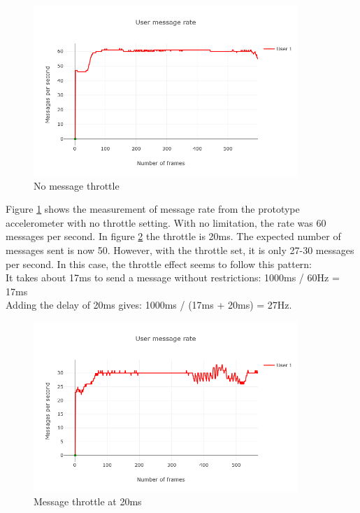 \documentclass{l4proj}
\begin{document}
\begin{figure}[h!]
    \centering
    \includegraphics[width=10cm]{./images/nomthrot.png}
    \caption{No message throttle}
    \label{fig:nomthrot}
\end{figure}

Figure \ref{fig:nomthrot} shows the measurement of message rate from the prototype accelerometer with no throttle setting. With no limitation, the rate was 60 messages per second. In figure \ref{mthrot} the throttle is 20ms. The expected number of messages sent is now 50. However, with the throttle set, it is only 27-30 messages per second. In this case, the throttle effect seems to follow this pattern: \\ 
It takes about 17ms to send a message without restrictions: 1000ms / 60Hz = 17ms \\ 
Adding the delay of 20ms gives: 1000ms / (17ms + 20ms) = 27Hz. \par

\pagebreak

\begin{figure}[h!]
    \centering
        \includegraphics[width=10cm]{./images/mthrot.png} 
        \caption{Message throttle at 20ms}
        \label{mthrot}
\end{figure}
\end{document}
